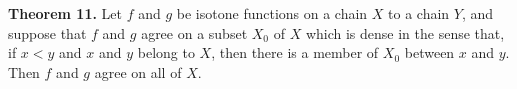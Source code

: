 \textbf{Theorem 11.} Let $f$ and $g$ be isotone functions on a chain $X$ to a chain $Y$, and suppose that $f$ and $g$ agree on a subset $X_0$ of $X$ which is dense in the sense that, if $x < y$ and $x$ and $y$ belong to $X$, then there is a member of $X_0$ between $x$ and $y$. Then $f$ and $g$ agree on all of $X$.
